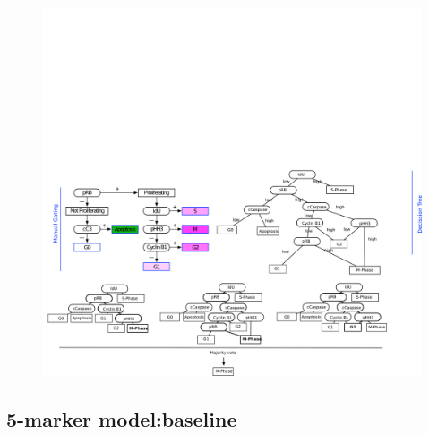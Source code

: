 \begin{figure}
    \centering
    \includegraphics{03cygnal/figs/3CLASS_stateRF.png}
    \caption{}
    \label{}
\end{figure}

\subsection{5-marker model:baseline}

